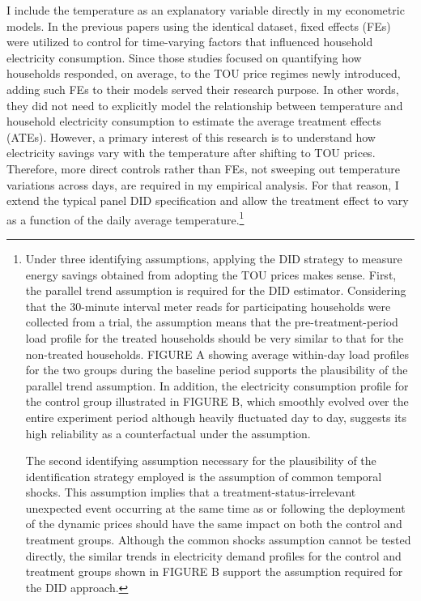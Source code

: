 I include the temperature as an explanatory variable directly in my econometric models. In the previous papers using the identical dataset, fixed effects (FEs) were utilized to control for time-varying factors that influenced household electricity consumption. Since those studies focused on quantifying how households responded, on average, to the TOU price regimes newly introduced, adding such FEs to their models served their research purpose. In other words, they did not need to explicitly model the relationship between temperature and household electricity consumption to estimate the average treatment effects (ATEs). However, a primary interest of this research is to understand how electricity savings vary with the temperature after shifting to TOU prices. Therefore, more direct controls rather than FEs, not sweeping out temperature variations across days, are required in my empirical analysis. For that reason, I extend the typical panel DID specification and allow the treatment effect to vary as a function of the daily average temperature.\footnote{Under three identifying assumptions, applying the DID strategy to measure energy savings obtained from adopting the TOU prices makes sense. First, the parallel trend assumption is required for the DID estimator. Considering that the 30-minute interval meter reads for participating households were collected from a trial, the assumption means that the pre-treatment-period load profile for the treated households should be very similar to that for the non-treated households. FIGURE A showing average within-day load profiles for the two groups during the baseline period supports the plausibility of the parallel trend assumption. In addition, the electricity consumption profile for the control group illustrated in FIGURE B, which smoothly evolved over the entire experiment period although heavily fluctuated day to day, suggests its high reliability as a counterfactual under the assumption. \par
The second identifying assumption necessary for the plausibility of the identification strategy employed is the assumption of common temporal shocks. This assumption implies that a treatment-status-irrelevant unexpected event occurring at the same time as or following the deployment of the dynamic prices should have the same impact on both the control and treatment groups. Although the common shocks assumption cannot be tested directly, the similar trends in electricity demand profiles for the control and treatment groups shown in FIGURE B support the assumption required for the DID approach. \par
}
